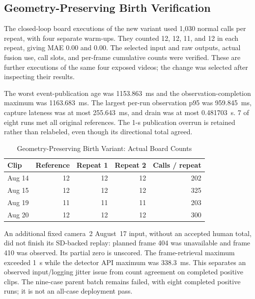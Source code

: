 \subsection{Geometry-Preserving Birth Verification}
The closed-loop board executions of the new variant used 1,030 normal calls per repeat, with four separate warm-ups. They counted 12, 12, 11, and 12 in each repeat, giving MAE 0.00 and 0.00. The selected input and raw outputs, actual fusion use, call slots, and per-frame cumulative counts were verified. These are further executions of the same four exposed videos; the change was selected after inspecting their results.

The worst event-publication age was 1153.863~ms and the observation-completion maximum was 1163.683~ms. The largest per-run observation p95 was 959.845~ms, capture lateness was at most 255.643~ms, and drain was at most 0.481703~s. 7 of eight runs met all original references. The 1-s publication overrun is retained rather than relabeled, even though its directional total agreed.

\begin{table}[!t]
\caption{Geometry-Preserving Birth Variant: Actual Board Counts}
\label{tab:fusion}
\centering\small
\begin{tabular}{lrrrr}
\toprule
Clip & Reference & Repeat 1 & Repeat 2 & Calls / repeat\\
\midrule
Aug 14 & 12 & 12 & 12 & 202\\
Aug 15 & 12 & 12 & 12 & 325\\
Aug 19 & 11 & 11 & 11 & 203\\
Aug 20 & 12 & 12 & 12 & 300\\
\bottomrule
\end{tabular}
\end{table}

An additional fixed camera~2 August~17 input, without an accepted human total, did not finish its SD-backed replay: planned frame 404 was unavailable and frame 410 was observed. Its partial zero is unscored. The frame-retrieval maximum exceeded 1~s while the detector API maximum was 338.3~ms. This separates an observed input/logging jitter issue from count agreement on completed positive clips. The nine-case parent batch remains failed, with eight completed positive runs; it is not an all-case deployment pass.

